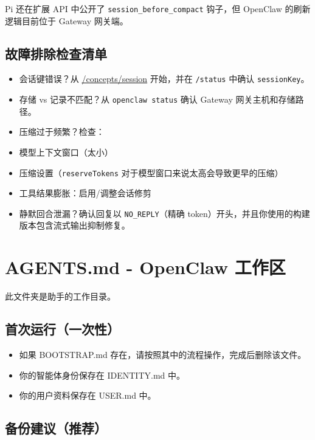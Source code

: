 Pi 还在扩展 API 中公开了 \texttt{session\_before\_compact} 钩子，但 OpenClaw 的刷新逻辑目前位于 Gateway 网关端。

\hrulefill


\subsection{故障排除检查清单}


\begin{itemize}
  \item 会话键错误？从 \href{/concepts/session}{/concepts/session} 开始，并在 \texttt{/status} 中确认 \texttt{sessionKey}。
  \item 存储 vs 记录不匹配？从 \texttt{openclaw status} 确认 Gateway 网关主机和存储路径。
  \item 压缩过于频繁？检查：
  \item 模型上下文窗口（太小）
  \item 压缩设置（\texttt{reserveTokens} 对于模型窗口来说太高会导致更早的压缩）
  \item 工具结果膨胀：启用/调整会话修剪
  \item 静默回合泄漏？确认回复以 \texttt{NO\_REPLY}（精确 token）开头，并且你使用的构建版本包含流式输出抑制修复。
\end{itemize}



\clearpage

\section{AGENTS.md - OpenClaw 工作区}


此文件夹是助手的工作目录。

\subsection{首次运行（一次性）}


\begin{itemize}
  \item 如果 BOOTSTRAP.md 存在，请按照其中的流程操作，完成后删除该文件。
  \item 你的智能体身份保存在 IDENTITY.md 中。
  \item 你的用户资料保存在 USER.md 中。
\end{itemize}


\subsection{备份建议（推荐）}


